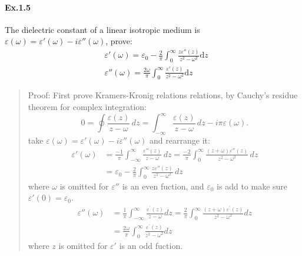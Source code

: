 \documentclass[11pt,a4paper,oneside]{book}
\begin{document}
\paragraph{Ex.1.5} The dielectric constant of a linear isotropic medium is $\varepsilon(\omega)=\varepsilon'(\omega)-i\varepsilon''(\omega)$, prove:\begin{equation}
	\begin{aligned}
		&\varepsilon'(\omega)=\varepsilon_0-\frac{2}{\pi}\int_0^\infty\frac{z \varepsilon''(z)}{z^2-\omega^2}\text{d}z\\
		&\varepsilon''(\omega)=\frac{2\omega}{\pi}\int_0^\infty\frac{ \varepsilon'(z)}{z^2-\omega^2}\text{d}z
	\end{aligned}
\end{equation}
\begin{quotation}
	Proof: First prove Kramers-Kronig relations relations, by Cauchy's residue theorem for complex integration:
\begin{equation}
	{\displaystyle 0=\oint {\frac {\varepsilon(z)}{z-\omega }}\,dz=\int _{-\infty }^{\infty }{\frac {\varepsilon (z)}{z-\omega }}\,dz-i\pi \varepsilon (\omega ).}
\end{equation}
	take $\varepsilon(\omega)=\varepsilon'(\omega)-i\varepsilon''(\omega)$ and rearrange it:
	\begin{equation}
		\begin{aligned}
			\varepsilon'(\omega)&=\frac{-1}{\pi}\!\!\int _{-\infty }^{\infty }{\frac {\varepsilon'' (z)}{z-\omega }}\,dz=\frac{-2}{\pi}\!\!\int _{0 }^{\infty }{\frac {(z+\omega)\varepsilon'' (z)}{z^2-\omega^2 }}\,dz\\
			&=\varepsilon_0-\frac{2}{\pi}\!\!\int _{0 }^{\infty }{\frac {z\varepsilon'' (z)}{z^2-\omega^2 }}\,dz
		\end{aligned}
	\end{equation}
	where $\omega$ is omitted for $\varepsilon''$ is an even fuction, and $\varepsilon_0$ is add to make sure $\varepsilon'(0)=\varepsilon_0$.
	\begin{equation}
		\begin{aligned}
			\varepsilon''(\omega)&=\frac{1}{\pi}  \int_{-\infty}^{\infty} \frac{\varepsilon^{\prime}(z)}{z-\omega} d z=\frac{2}{\pi}  \int_{0}^{\infty} \frac{(z+\omega)\varepsilon^{\prime}(z)}{z^2-\omega^2} d z\\
			&=\frac{2\omega}{\pi}\int_{0}^{\infty} \frac{\varepsilon^{\prime}(z)}{z^2-\omega^2} d z
		\end{aligned}
	\end{equation}
	where $z$ is omitted for $\varepsilon'$ is an odd fuction.
\end{quotation}
\end{document}
